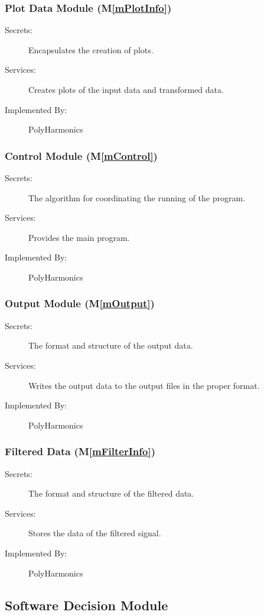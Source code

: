 \documentclass[12pt]{article}
\newcommand{\mref}[1]{M\ref{#1}}
\newcommand{\progname}{PolyHarmonics}
\begin{document}
\subsubsection{Plot Data Module (\mref{mPlotInfo})}
\begin{description}
\item[Secrets:] Encapsulates the creation of plots.
\item[Services:] Creates plots of the input data and transformed data.
\item[Implemented By:] \progname{}
\end{description}

\subsubsection{Control Module (\mref{mControl})}
\begin{description}
\item[Secrets:] The algorithm for coordinating the running of the program.
\item[Services:] Provides the main program.
\item[Implemented By:] \progname{}
\end{description}

\subsubsection{Output Module (\mref{mOutput})}
\begin{description}
\item[Secrets:] The format and structure of the output data.
\item[Services:] Writes the output data to the output files in the proper 
format.
\item[Implemented By:] \progname{}
\end{description}

\subsubsection{Filtered Data (\mref{mFilterInfo})}
\begin{description}
\item[Secrets:] The format and structure of the filtered data.
\item[Services:] Stores the data of the filtered signal.
\item[Implemented By:] \progname{}
\end{description}
\subsection{Software Decision Module}
\end{document}
